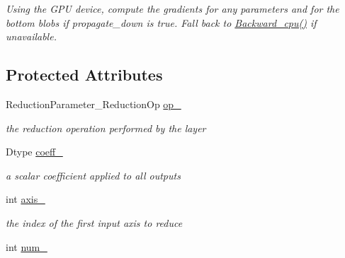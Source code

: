 \begin{DoxyCompactItemize}
\begin{DoxyCompactList}\small\item\em Using the G\+PU device, compute the gradients for any parameters and for the bottom blobs if propagate\+\_\+down is true. Fall back to \hyperlink{classcaffe_1_1ReductionLayer_afd66f4af0f9072c1bc60fc89e520a420}{Backward\+\_\+cpu()} if unavailable. \end{DoxyCompactList}\end{DoxyCompactItemize}
\subsection*{Protected Attributes}
\begin{DoxyCompactItemize}
\item 
Reduction\+Parameter\+\_\+\+Reduction\+Op \hyperlink{classcaffe_1_1ReductionLayer_aa65f46eaf24eca2948592bcb9e127346}{op\+\_\+}\hypertarget{classcaffe_1_1ReductionLayer_aa65f46eaf24eca2948592bcb9e127346}{}\label{classcaffe_1_1ReductionLayer_aa65f46eaf24eca2948592bcb9e127346}

\begin{DoxyCompactList}\small\item\em the reduction operation performed by the layer \end{DoxyCompactList}\item 
Dtype \hyperlink{classcaffe_1_1ReductionLayer_a7aeb19ec25f01d4df995ba2122fbfeb3}{coeff\+\_\+}\hypertarget{classcaffe_1_1ReductionLayer_a7aeb19ec25f01d4df995ba2122fbfeb3}{}\label{classcaffe_1_1ReductionLayer_a7aeb19ec25f01d4df995ba2122fbfeb3}

\begin{DoxyCompactList}\small\item\em a scalar coefficient applied to all outputs \end{DoxyCompactList}\item 
int \hyperlink{classcaffe_1_1ReductionLayer_ac42612a3e9d6fadcb2a57041595033bf}{axis\+\_\+}\hypertarget{classcaffe_1_1ReductionLayer_ac42612a3e9d6fadcb2a57041595033bf}{}\label{classcaffe_1_1ReductionLayer_ac42612a3e9d6fadcb2a57041595033bf}

\begin{DoxyCompactList}\small\item\em the index of the first input axis to reduce \end{DoxyCompactList}\item 
int \hyperlink{classcaffe_1_1ReductionLayer_a7c336b1554118959a13cecfd9701998e}{num\+\_\+}\hypertarget{classcaffe_1_1ReductionLayer_a7c336b1554118959a13cecfd9701998e}{}\label{classcaffe_1_1ReductionLayer_a7c336b1554118959a13cecfd9701998e}


\end{DoxyCompactItemize}
